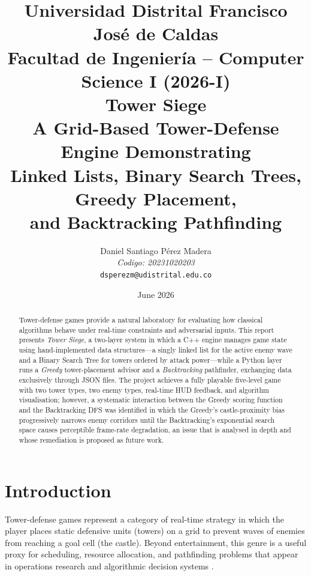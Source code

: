 \documentclass[12pt,a4paper]{report}
\title{
  \vspace{-1cm}
  {\Large Universidad Distrital Francisco José de Caldas} \\[0.4cm]
  {\large Facultad de Ingeniería -- Computer Science I (2026-I)} \\[1.2cm]
  {\Huge\bfseries Tower Siege} \\[0.5cm]
  {\large A Grid-Based Tower-Defense Engine Demonstrating\\
   Linked Lists, Binary Search Trees, Greedy Placement,\\
   and Backtracking Pathfinding}
}
\author{
  Daniel Santiago Pérez Madera \\
  \textit{Codigo: 20231020203} \\[0.5cm]
  \texttt{dsperezm@udistrital.edu.co}
}
\date{June 2026}
\begin{document}

\maketitle
\thispagestyle{empty}
\newpage

\begin{abstract}
Tower-defense games provide a natural laboratory for evaluating how classical
algorithms behave under real-time constraints and adversarial inputs.
This report presents \textit{Tower Siege}, a two-layer system in which a C++ engine
manages game state using hand-implemented data structures---a singly linked list
for the active enemy wave and a Binary Search Tree for towers ordered by attack
power---while a Python layer runs a \textit{Greedy} tower-placement advisor and
a \textit{Backtracking} pathfinder, exchanging data exclusively through JSON files.
The project achieves a fully playable five-level game with two tower types, two
enemy types, real-time HUD feedback, and algorithm visualisation; however, a
systematic interaction between the Greedy scoring function and the Backtracking
DFS was identified in which the Greedy's castle-proximity bias progressively
narrows enemy corridors until the Backtracking's exponential search space causes
perceptible frame-rate degradation, an issue that is analysed in depth and whose
remediation is proposed as future work.
\end{abstract}
\newpage

\tableofcontents
\newpage

\chapter{Introduction}
\label{ch:introduction}

Tower-defense games represent a category of real-time strategy in which the
player places static defensive units (towers) on a grid to prevent waves of
enemies from reaching a goal cell (the castle).
Beyond entertainment, this genre is a useful proxy for scheduling, resource
allocation, and pathfinding problems that appear in operations research and
algorithmic decision systems \cite{cormen2022algorithms}.
\end{document}

